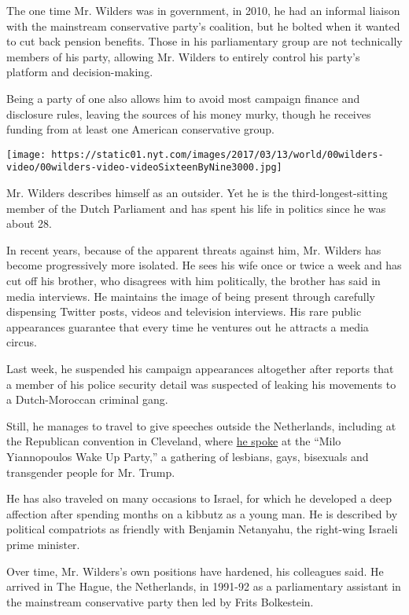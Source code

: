 The one time Mr. Wilders was in government, in 2010, he had an informal
liaison with the mainstream conservative party's coalition, but he
bolted when it wanted to cut back pension benefits. Those in his
parliamentary group are not technically members of his party, allowing
Mr. Wilders to entirely control his party's platform and
decision-making.

Being a party of one also allows him to avoid most campaign finance and
disclosure rules, leaving the sources of his money murky, though he
receives funding from at least one American conservative group.

\texttt{[image: https://static01.nyt.com/images/2017/03/13/world/00wilders-video/00wilders-video-videoSixteenByNine3000.jpg]}

Mr. Wilders describes himself as an outsider. Yet he is the
third-longest-sitting member of the Dutch Parliament and has spent his
life in politics since he was about 28.

In recent years, because of the apparent threats against him, Mr.
Wilders has become progressively more isolated. He sees his wife once or
twice a week and has cut off his brother, who disagrees with him
politically, the brother has said in media interviews. He maintains the
image of being present through carefully dispensing Twitter posts,
videos and television interviews. His rare public appearances guarantee
that every time he ventures out he attracts a media circus.

Last week, he suspended his campaign appearances altogether after
reports that a member of his police security detail was suspected of
leaking his movements to a Dutch-Moroccan criminal gang.

Still, he manages to travel to give speeches outside the Netherlands,
including at the Republican convention in Cleveland, where
\href{https://www.youtube.com/watch?v=5GJC17c2sfk}{he spoke} at the
``Milo Yiannopoulos Wake Up Party,'' a gathering of lesbians, gays,
bisexuals and transgender people for Mr. Trump.

He has also traveled on many occasions to Israel, for which he developed
a deep affection after spending months on a kibbutz as a young man. He
is described by political compatriots as friendly with Benjamin
Netanyahu, the right-wing Israeli prime minister.

Over time, Mr. Wilders's own positions have hardened, his colleagues
said. He arrived in The Hague, the Netherlands, in 1991-92 as a
parliamentary assistant in the mainstream conservative party then led by
Frits Bolkestein.

